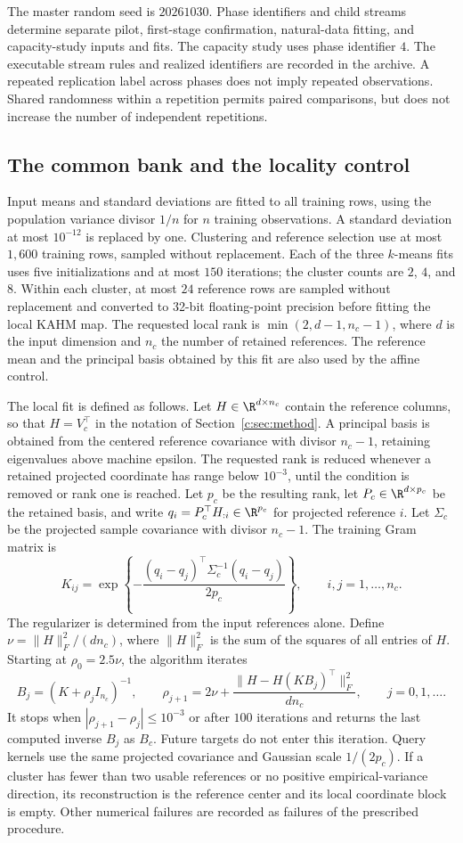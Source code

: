 The master random seed is $20261030$. Phase identifiers and child streams
determine separate pilot, first-stage confirmation, natural-data fitting,
and capacity-study inputs and fits. The capacity study uses phase
identifier $4$. The executable stream rules and realized identifiers
are recorded in the archive. A repeated replication label across
phases does not imply repeated observations. Shared randomness within
a repetition permits paired comparisons, but does not increase the
number of independent repetitions.

\subsection{The common bank and the locality control}

Input means and standard deviations are fitted to all training rows,
using the population variance divisor $1/n$ for $n$ training observations.
A standard deviation at most $10^{-12}$ is replaced by one. Clustering
and reference selection use at most $1{,}600$ training rows, sampled
without replacement. Each of the three $k$-means fits uses five
initializations and at most $150$ iterations; the cluster counts are
$2$, $4$, and $8$. Within each cluster, at most $24$ reference rows are
sampled without replacement and converted to 32-bit floating-point
precision before fitting the local KAHM map. The requested local rank
is $\min(2,d-1,n_c-1)$, where $d$ is the input dimension and $n_c$
the number of retained references. The reference mean and the principal
basis obtained by this fit are also used by the affine control.

The local fit is defined as follows. Let
$H\in\R^{d\times n_c}$ contain the reference columns, so that
$H=V_c^\top$ in the notation of Section~\ref{c:sec:method}.
A principal basis is obtained from the centered reference covariance
with divisor $n_c-1$, retaining eigenvalues above machine epsilon.
The requested rank is reduced whenever a retained projected coordinate
has range below $10^{-3}$, until the condition is removed or rank one
is reached. Let $p_c$ be the resulting rank, let
$P_c\in\R^{d\times p_c}$ be the retained basis, and write
$q_i=P_c^\top H_{:i}\in\R^{p_c}$ for projected reference $i$.
Let $\Sigma_c$ be the projected sample covariance with divisor $n_c-1$.
The training Gram matrix is
\[
 K_{ij}=\exp\left\{-\frac{
 (q_i-q_j)^\top\Sigma_c^{-1}(q_i-q_j)}{2p_c}\right\},
 \qquad i,j=1,\ldots,n_c.
\]
The regularizer is determined from the input references alone. Define
$\nu=\|H\|_F^2/(dn_c)$, where $\|H\|_F^2$ is the sum of the squares
of all entries of $H$. Starting at $\rho_0=2.5\nu$, the algorithm
iterates
\[
 B_j=(K+\rho_jI_{n_c})^{-1},\qquad
 \rho_{j+1}=2\nu+
 \frac{\|H-H(KB_j)^\top\|_F^2}{dn_c},\qquad j=0,1,\ldots.
\]
It stops when $|\rho_{j+1}-\rho_j|\leq10^{-3}$ or after $100$
iterations and returns the last computed inverse $B_j$ as $B_c$.
Future targets do not enter this iteration. Query kernels use the
same projected covariance and Gaussian scale $1/(2p_c)$.
If a cluster has fewer than two usable references or no positive
empirical-variance direction, its reconstruction is the reference
center and its local coordinate block is empty. Other numerical
failures are recorded as failures of the prescribed procedure.

